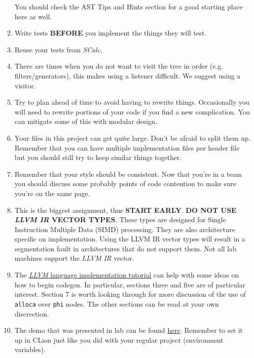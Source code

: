 \documentclass{article}
\newcommand{\code}[1]{\texttt{\textmd{#1}}}
\begin{document}
\begin{enumerate}
    You should check the AST Tips and Hints section for a good starting place here as well.
  \item
    Write tests \textbf{BEFORE} you implement the things they will test.
  \item
    Reuse your tests from \textit{SCalc}.
  \item
    There are times when you do not want to visit the tree in order (e.g. filters/generators), this
    makes using a listener difficult. We suggest using a visitor.
  \item
    Try to plan ahead of time to avoid having to rewrite things. Occasionally you will need to
    rewrite portions of your code if you find a new complication. You can mitigate some of this with
    modular design.
  \item
    Your files in this project can get quite large. Don't be afraid to split them up. Remember that
    you can have multiple implementation files per header file but you should still try to keep
    similar things together.
  \item
    Remember that your style should be consistent. Now that you're in a team you should discuss some
    probably points of code contention to make sure you're on the same page.
  \item
    This is the biggest assignment, thus \textbf{START EARLY}.
    \textbf{DO NOT USE \textit{LLVM IR} VECTOR TYPES}. These types are designed for Single
    Instruction Multiple Data (SIMD) processing. They are also architecture specific on
    implementation. Using the LLVM IR vector types will result in a segmentation fault in
    architectures that do not support them. Not all lab machines support the \textit{LLVM IR}
    vector.
  \item
    The \href{http://releases.llvm.org/6.0.1/docs/tutorial/index.html}{\textit{LLVM} language
    implementation tutorial} can help with some ideas on how to begin codegen. In particular,
    sections three and five are of particular interest. Section 7 is worth looking through for more
    discussion of the use of \code{alloca} over \code{phi} nodes. The other sections can be read at
    your own discrection.
  \item
    The demo that was presented in lab can be found
    \href{https://webdocs.cs.ualberta.ca/\%7Ec415/vcalc/static/labdemo.tar.gz}{here}. Remember to
    set it up in CLion just like you did with your regular project (environment variables).
\end{enumerate}
\end{document}
